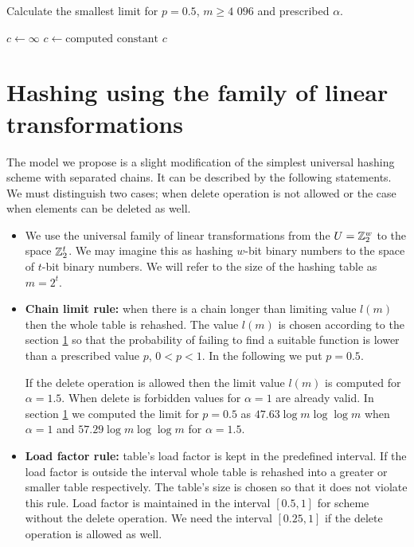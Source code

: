 \begin{algorithm}
\caption{Calculate the smallest limit for $p=0.5$, $m \geq \text{4 096}$ and prescribed $\alpha$.}
\label{algorithm-scheme-3}
\begin{algorithmic}
\STATE $c \leftarrow \infty$
				\STATE $c \leftarrow \text{computed constant}$
			\ENDIF
		\ENDFOR
	\ENDFOR
\ENDFOR
\STATE
\RETURN $c$
\end{algorithmic}
\end{algorithm}

\section{Hashing using the family of linear transformations}
\label{section-hashing-linear-transformations}
The model we propose is a slight modification of the simplest universal hashing scheme with separated chains. It can be described by the following statements. We must distinguish two cases; when delete operation is not allowed or the case when elements can be deleted as well.
\begin{itemize}
\item We use the universal family of linear transformations from the $U = \mathbb{Z}_{2}^{w}$ to the space $\mathbb{Z}_{2}^{t}$. We may imagine this as hashing $w$-bit binary numbers to the space of $t$-bit binary numbers. We will refer to the size of the hashing table as $m = 2 ^ t$.
\item \textbf{Chain limit rule:} when there is a chain longer than limiting value $l(m)$ then the whole table is rehashed. The value $l(m)$ is chosen according to the section \ref{section-hashing-linear-transformations} so that the probability of failing to find a suitable function is lower than a prescribed value $p$, $0 < p < 1$. In the following we put $p = 0.5$. 

If the delete operation is allowed then the limit value $l(m)$ is computed for $\alpha = 1.5$. When delete is forbidden values for $\alpha = 1$ are already valid. In section \ref{section-hashing-linear-transformations} we computed the limit for $p = 0.5$ as $47.63 \log m \log \log m$ when $\alpha = 1$ and $57.29 \log m \log \log m$ for $\alpha = 1.5$.
\item \textbf{Load factor rule:} table's load factor is kept in the predefined interval. If the load factor is outside the interval whole table is rehashed into a greater or smaller table respectively. The table's size is chosen so that it does not violate this rule. Load factor is maintained in the interval $\left[0.5, 1\right]$ for scheme without the delete operation. We need the interval $\left[0.25, 1\right]$ if the delete operation is allowed as well.
\end{itemize}

